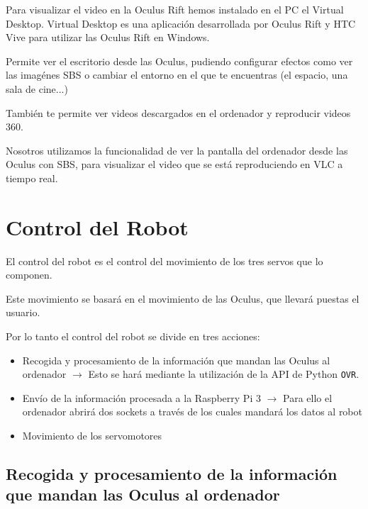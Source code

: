 \documentclass[twoside, 11pt]{epstfg}
\begin{document}
Para visualizar el video en la Oculus Rift hemos instalado en el PC el  Virtual Desktop. Virtual Desktop es una aplicación desarrollada por Oculus Rift y  HTC Vive para utilizar las Oculus Rift en Windows.

Permite ver el escritorio desde las Oculus, pudiendo configurar efectos como ver las imagénes SBS o cambiar el entorno en el que te encuentras (el espacio, una sala de cine...)



También te permite ver videos descargados en el ordenador y reproducir videos 360.

Nosotros utilizamos la funcionalidad de ver la pantalla del ordenador desde las Oculus con SBS, para visualizar el video que se está reproduciendo en VLC a tiempo real.



\newpage

\section{Control del Robot}
El control del robot es el control del movimiento de los tres servos que lo componen. 

Este movimiento se basará en el movimiento de las Oculus, que llevará puestas el usuario.

Por lo tanto el control del robot se divide en tres acciones:
\begin{itemize}
	\item Recogida y procesamiento de la información que mandan las Oculus al ordenador $\rightarrow$ Esto se hará mediante la utilización de la API de Python \texttt{OVR}.
	
	\item Envío de la información procesada a la Raspberry Pi 3 $\rightarrow$ Para ello el ordenador abrirá dos sockets a través de los cuales mandará los datos al robot
	
	\item Movimiento de los servomotores
\end{itemize}
\subsection{Recogida y procesamiento de la información que mandan las Oculus al ordenador}
\end{document}
